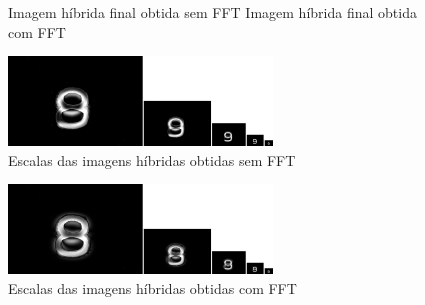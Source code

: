 \begin{figure}[H]
    \centering
    \caption[]{ Imagem híbrida final obtida sem FFT { Imagem híbrida final obtida com FFT}}
    \label{fig:finalNum}
\end{figure}



\begin{figure}[H]
    \centering
    \includegraphics[width=7cm]{numeros/hybrid_image_scales.jpg}
    \caption{Escalas das imagens híbridas obtidas sem FFT}
    \label{fig:gen_hybrid_image_scalesNum}
\end{figure}

\begin{figure}[H]
    \centering
    \includegraphics[width=7cm]{numeros/hybrid_image_scales_fft.jpg}
    \caption{Escalas das imagens híbridas obtidas com FFT}
    \label{fig:gen_hybrid_image_scalesNum2}
\end{figure}






